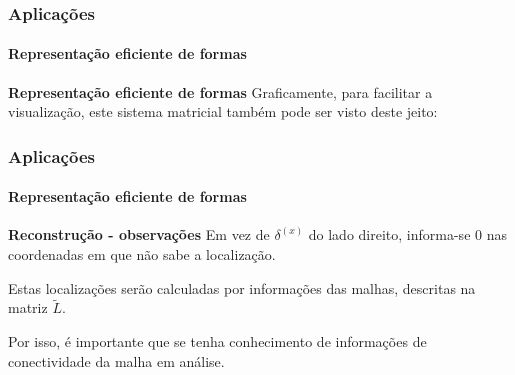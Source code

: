 \begin{frame}
	\frametitle{{\bf \color{blue} Aplicações}}
	\framesubtitle{\color{blue} Representação eficiente de formas}
	
	\begin{block}{\bf Representação eficiente de formas}
		Graficamente, para facilitar a visualização, este sistema matricial também pode ser visto deste jeito:
		
		\begin{center}
		\end{center}
		
	\end{block}
	
\end{frame}


\begin{frame}
\frametitle{{\bf \color{blue} Aplicações}}
\framesubtitle{\color{blue} Representação eficiente de formas}
	
\begin{block}{\bf Reconstrução - observações}
Em vez de $\delta^{(x)}$ do lado direito, informa-se $0$ nas coordenadas em que não sabe a localização.

\medskip

Estas localizações serão calculadas por informações das malhas, descritas na matriz $\tilde{L}$.

\medskip

Por isso, é importante que se tenha conhecimento de informações de conectividade da malha em análise.
\end{block}
\end{frame}


